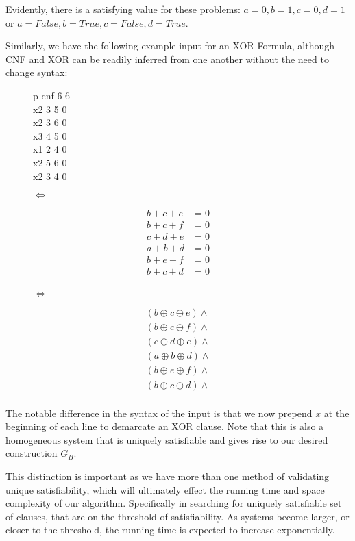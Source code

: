 Evidently, there is a satisfying value for these problems: $a=0, b=1, c=0, d=1$ or $a=False, b=True, c=False, d=True$.
\par
Similarly, we have the following example input for an XOR-Formula, although CNF and XOR can be readily inferred from one another without the need to change syntax:
\begin{figure}[htbp!]
	\centering
	\begin{minipage}{.2\textwidth}
		p cnf 6 6 \\
		x2 3 5 0 \\
		x2 3 6 0 \\
		x3 4 5 0 \\
		x1 2 4 0 \\
		x2 5 6 0 \\
		x2 3 4 0 \\
	\end{minipage}
	$\iff$
	\begin{minipage}{.2\textwidth}
		\begin{align*}
			b + c + e &= 0 \\
			b + c + f &= 0 \\
			c + d + e &= 0 \\
			a + b + d &= 0 \\
			b + e + f &= 0 \\
			b + c + d &= 0 \\
		\end{align*}
	\end{minipage}
	$\iff$
	\begin{minipage}{.2\textwidth}
		\begin{align*}
			(b \oplus c \oplus e) \land \\
			(b \oplus c \oplus f) \land \\
			(c \oplus d \oplus e) \land \\
			(a \oplus b \oplus d) \land \\
			(b \oplus e \oplus f) \land \\
			(b \oplus c \oplus d) \land \\
		\end{align*}    
	\end{minipage}
\end{figure}

The notable difference in the syntax of the input is that we now prepend $x$ at the beginning of each line to demarcate an XOR clause. Note that this is also a homogeneous system that is uniquely satisfiable and gives rise to our desired construction $G_B$.
\par
This distinction is important as we have more than one method of validating unique satisfiability, which will ultimately effect the running time and space complexity of our algorithm. Specifically in searching for uniquely satisfiable set of clauses, that are on the threshold of satisfiability. As systems become larger, or closer to the threshold, the running time is expected to increase exponentially.

